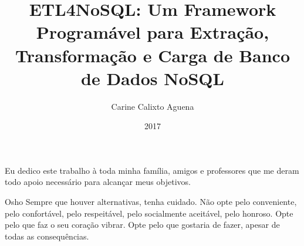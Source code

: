 \documentclass[pt,oneside,onehalfspacing,msc]{risethesis}
\title{ETL4NoSQL: Um Framework Programável para Extração, Transformação e Carga de Banco de Dados NoSQL}
\date{2017}
\author{Carine Calixto Aguena}
\begin{document}
\frontmatter

\frontpage

\presentationpage


\begin{dedicatory}
Eu dedico este trabalho à toda minha família, amigos e professores que me deram todo apoio necessário para alcançar meus objetivos.
\end{dedicatory}

\acknowledgements



\begin{epigraph}[]{Osho}
Sempre que houver alternativas, tenha cuidado. Não opte pelo conveniente, pelo confortável, pelo respeitável, pelo socialmente aceitável, pelo honroso. 
Opte pelo que faz o seu coração vibrar. Opte pelo que gostaria de fazer, apesar de todas as consequências.
\end{epigraph}

\resumo
{\parindent0pt
	
}

\abstract
{\parindent0pt
	
}

\listoffigures

\listoftables

\listofacronyms


\tableofcontents

\mainmatter



%






\begin{references}
  
\end{references}


%
\end{document}
